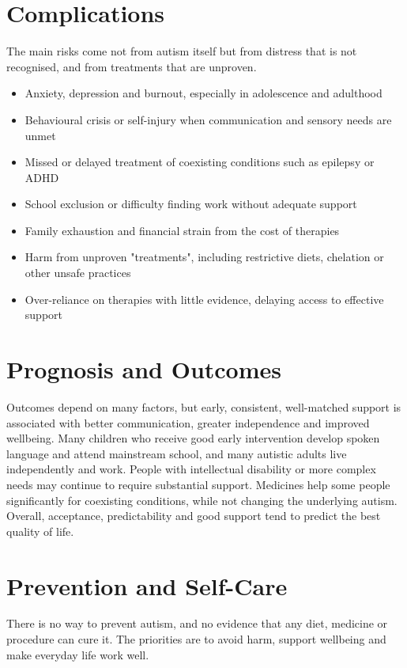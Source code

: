 \section*{Complications}
The main risks come not from autism itself but from distress that is not recognised, and from treatments that are unproven.

\begin{itemize}
    \item Anxiety, depression and burnout, especially in adolescence and adulthood
    \item Behavioural crisis or self-injury when communication and sensory needs are unmet
    \item Missed or delayed treatment of coexisting conditions such as epilepsy or ADHD
    \item School exclusion or difficulty finding work without adequate support
    \item Family exhaustion and financial strain from the cost of therapies
    \item Harm from unproven "treatments", including restrictive diets, chelation or other unsafe practices
    \item Over-reliance on therapies with little evidence, delaying access to effective support
\end{itemize}

\section*{Prognosis and Outcomes}
Outcomes depend on many factors, but early, consistent, well-matched support is associated with better communication, greater independence and improved wellbeing. Many children who receive good early intervention develop spoken language and attend mainstream school, and many autistic adults live independently and work. People with intellectual disability or more complex needs may continue to require substantial support. Medicines help some people significantly for coexisting conditions, while not changing the underlying autism. Overall, acceptance, predictability and good support tend to predict the best quality of life.

\section*{Prevention and Self-Care}
There is no way to prevent autism, and no evidence that any diet, medicine or procedure can cure it. The priorities are to avoid harm, support wellbeing and make everyday life work well.

